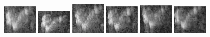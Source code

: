 \begin{figure}
    \includegraphics[width=0.15\textwidth]{chapters/images/dataset/all-class-images/hook/hook-96.jpg}
    \includegraphics[width=0.15\textwidth]{chapters/images/dataset/all-class-images/hook/hook-116.jpg}
    \includegraphics[width=0.15\textwidth]{chapters/images/dataset/all-class-images/hook/hook-58.jpg}
    \includegraphics[width=0.15\textwidth]{chapters/images/dataset/all-class-images/hook/hook-91.jpg}
    \includegraphics[width=0.15\textwidth]{chapters/images/dataset/all-class-images/hook/hook-76.jpg}
    \includegraphics[width=0.15\textwidth]{chapters/images/dataset/all-class-images/hook/hook-88.jpg}
    

\end{figure}
